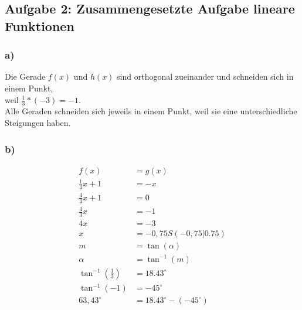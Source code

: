 \documentclass[a4paper, 10pt]{scrartcl}
\begin{document}
\subsection*{\textbf{Aufgabe 2: Zusammengesetzte Aufgabe lineare Funktionen}}
	\begin{minipage}{1\textwidth}
		\subsubsection*{a)}
			Die Gerade $f(x)$ und $h(x)$ sind orthogonal zueinander und schneiden sich in einem Punkt, \\
			weil $\frac{1}{3} * (-3) = -1$. \\
			Alle Geraden schneiden sich jeweils in einem Punkt, weil sie eine unterschiedliche Steigungen haben.
	\end{minipage}
	\begin{minipage}{0.5\textwidth}
		\vspace*{-5mm}
		\subsubsection*{b)}
			\begin{align*}
				f(x) &= g(x) \\
				\frac{1}{3}x + 1 &= -x \\
				\frac{4}{3}x + 1 &= 0 \\
				\frac{4}{3}x &= -1 \\
				4x &= -3 \\
				x &= -0,75 
				S(-0,75 | 0.75) \\
				m &= \tan(\alpha) \\
				\alpha &= \tan^{-1}(m) \\
				\tan^{-1}(\frac{1}{3}) &= 18.43^{\circ} \\
				\tan^{-1}(-1) &= -45^{\circ}\\
				63,43^{\circ} &= 18.43^{\circ} -(-45^{\circ}) \\ 
			\end{align*}
		\end{minipage}
\end{document}

